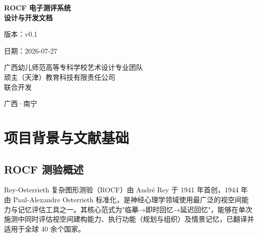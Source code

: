 \documentclass[12pt,a4paper]{ctexart}
\begin{document}
\begin{titlepage}
\centering
\vspace*{6cm}

{\Huge\bfseries ROCF 电子测评系统\\[6pt] 设计与开发文档\par}

\vspace{2cm}

{\LARGE 版本：v0.1\par}

\vspace{1cm}

{\Large 日期：2026-07-27\par}

\vspace{1cm}

{\normalsize 广西幼儿师范高等专科学校艺术设计专业团队\\顽主（天津）教育科技有限责任公司\\联合开发\par}

\vfill

{\footnotesize 广西·南宁\par}
\end{titlepage}

\tableofcontents
\newpage


\section{项目背景与文献基础}

\subsection{ROCF 测验概述}

Rey-Osterrieth 复杂图形测验（ROCF）由 André Rey 于 1941 年首创，1944 年由 Paul-Alexandre Osterrieth 标准化，是神经心理学领域使用最广泛的视空间能力与记忆评估工具之一。其核心范式为"临摹→即时回忆→延迟回忆"，能够在单次施测中同时评估视空间建构能力、执行功能（规划与组织）及情景记忆，已翻译并适用于全球 40 余个国家。
\end{document}
